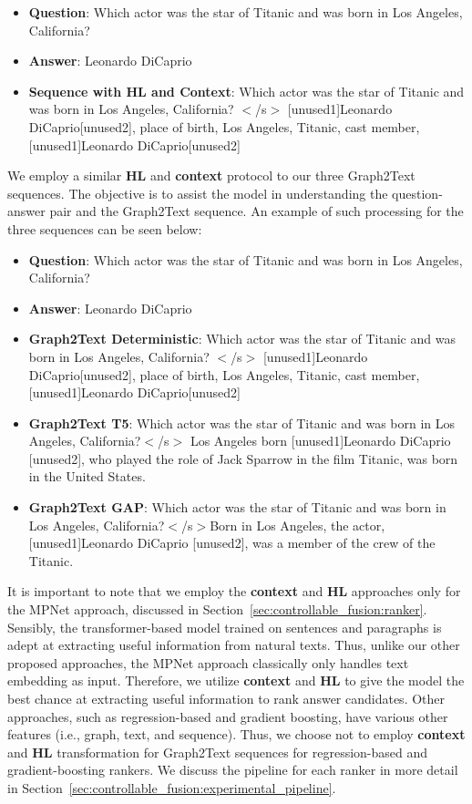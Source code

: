\begin{itemize}
    \item \textbf{Question}: Which actor was the star of Titanic and was born in Los Angeles, California?
    \item \textbf{Answer}: Leonardo DiCaprio
    \item \textbf{Sequence with HL and Context}: Which actor was the star of Titanic and was born in Los Angeles, California? $<$/s$>$ [unused1]Leonardo DiCaprio[unused2], place of birth, Los Angeles, Titanic, cast member, [unused1]Leonardo DiCaprio[unused2]
\end{itemize}

\noindent We employ a similar \textbf{HL} and \textbf{context} protocol to our three Graph2Text sequences. The objective is to assist the model in understanding the question-answer pair and the Graph2Text sequence. An example of such processing for the three sequences can be seen below:

\begin{itemize}
    \item \textbf{Question}: Which actor was the star of Titanic and was born in Los Angeles, California?
    \item \textbf{Answer}: Leonardo DiCaprio
    \item \textbf{Graph2Text Deterministic}: Which actor was the star of Titanic and was born in Los Angeles, California? $<$/s$>$ [unused1]Leonardo DiCaprio[unused2], place of birth, Los Angeles, Titanic, cast member, [unused1]Leonardo DiCaprio[unused2]
    \item \textbf{Graph2Text T5}: Which actor was the star of Titanic and was born in Los Angeles, California?$<$/s$>$ Los Angeles born [unused1]Leonardo DiCaprio [unused2], who played the role of Jack Sparrow in the film Titanic, was born in the United States.
    \item \textbf{Graph2Text GAP}: Which actor was the star of Titanic and was born in Los Angeles, California?$<$/s$>$Born in Los Angeles, the actor, [unused1]Leonardo DiCaprio [unused2], was a member of the crew of the Titanic.
\end{itemize}

\noindent It is important to note that we employ the \textbf{context} and \textbf{HL} approaches only for the MPNet approach, discussed in Section~\ref{sec:controllable_fusion:ranker}. Sensibly, the transformer-based model trained on sentences and paragraphs is adept at extracting useful information from natural texts. Thus, unlike our other proposed approaches, the MPNet approach classically only handles text embedding as input. Therefore, we utilize \textbf{context} and \textbf{HL} to give the model the best chance at extracting useful information to rank answer candidates. Other approaches, such as regression-based and gradient boosting, have various other features (i.e., graph, text, and sequence). Thus, we choose not to employ \textbf{context} and \textbf{HL} transformation for Graph2Text sequences for regression-based and gradient-boosting rankers. We discuss the pipeline for each ranker in more detail in Section~\ref{sec:controllable_fusion:experimental_pipeline}.

